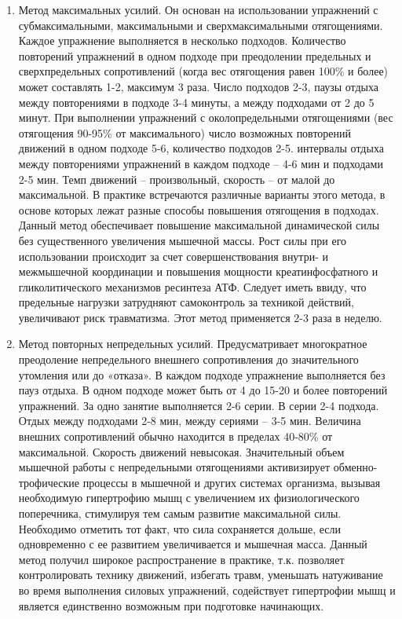 \begin{enumerate}
    \item Метод максимальных усилий. Он основан на использовании упражнений с субмаксимальными, максимальными и сверхмаксимальными отягощениями. Каждое упражнение выполняется в несколько подходов. Количество повторений упражнений в одном подходе при преодолении предельных и сверхпредельных сопротивлений (когда вес отягощения равен 100\% и более) может составлять 1-2, максимум 3 раза. Число подходов 2-3, паузы отдыха между повторениями в подходе 3-4 минуты, а между подходами от 2 до 5 минут. При выполнении упражнений с околопредельными отягощениями (вес отягощения 90-95\% от максимального) число возможных повторений движений в одном подходе 5-6, количество подходов 2-5. интервалы отдыха между повторениями упражнений в каждом подходе – 4-6 мин и подходами 2-5 мин. Темп движений – произвольный, скорость – от малой до максимальной. В практике встречаются различные варианты этого метода, в основе которых лежат разные способы повышения отягощения в подходах. Данный метод обеспечивает повышение максимальной динамической силы без существенного увеличения мышечной массы. Рост силы при его использовании происходит за счет совершенствования внутри- и межмышечной координации и повышения мощности креатинфосфатного и гликолитического механизмов ресинтеза АТФ. Следует иметь ввиду, что предельные нагрузки затрудняют самоконтроль за техникой действий, увеличивают риск травматизма. Этот метод применяется 2-3 раза в неделю.
    \item Метод повторных непредельных усилий. Предусматривает многократное преодоление непредельного внешнего сопротивления до значительного утомления или до «отказа». В каждом подходе упражнение выполняется без пауз отдыха. В одном подходе может быть от 4 до 15-20 и более повторений упражнений. За одно занятие выполняется 2-6 серии. В серии 2-4 подхода. Отдых между подходами 2-8 мин, между сериями – 3-5 мин. Величина внешних сопротивлений обычно находится в пределах 40-80\% от максимальной. Скорость движений невысокая. Значительный объем мышечной работы с непредельными отягощениями активизирует обменно-трофические процессы в мышечной и других системах организма, вызывая необходимую гипертрофию мышц с увеличением их физиологического поперечника, стимулируя тем самым развитие максимальной силы. Необходимо отметить тот факт, что сила сохраняется дольше, если одновременно с ее развитием увеличивается и мышечная масса. Данный метод получил широкое распространение в практике, т.к. позволяет контролировать технику движений, избегать травм, уменьшать натуживание во время выполнения силовых упражнений, содействует гипертрофии мышц и является единственно возможным при подготовке начинающих.

\end{enumerate}
